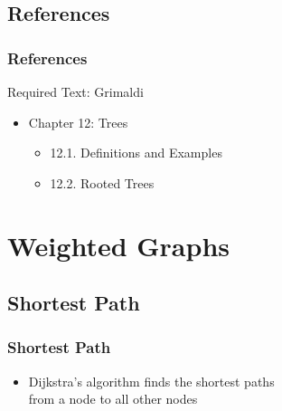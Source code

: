 \documentclass[dvipsnames]{beamer}
\begin{document}
\subsection*{References}

\begin{frame}
  \frametitle{References}

  \begin{block}{Required Text: Grimaldi}
    \begin{itemize}
      \item Chapter 12: Trees
      \begin{itemize}
        \item 12.1. \alert{Definitions and Examples}
        \item 12.2. \alert{Rooted Trees}
      \end{itemize}
    \end{itemize}
  \end{block}
\end{frame}

\section{Weighted Graphs}

\subsection{Shortest Path}

\begin{frame}
  \frametitle{Shortest Path}

  \begin{itemize}
    \item Dijkstra's algorithm finds the shortest paths\\
      from a node to all other nodes
  \end{itemize}
\end{frame}
\end{document}

